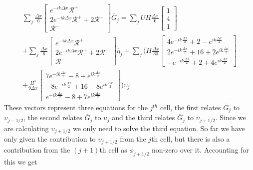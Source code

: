 \begin{multline*}
\sum_j \frac{\Delta x}{6}\begin{bmatrix} e^{-ik\Delta x} \mathcal{R}^+ \\2 e^{-ik\Delta x} \mathcal{R}^+ +2 \mathcal{R}^-\\ \mathcal{R}^- \end{bmatrix} \overline{G}_{j} = \sum_jUH \frac{\Delta x}{6}\begin{bmatrix} 1 \\4 \\ 1 \end{bmatrix}  \\+  \sum_j \frac{\Delta x}{6}\begin{bmatrix} e^{-ik\Delta x} \mathcal{R}^+ \\2 e^{-ik\Delta x} \mathcal{R}^+ +2 \mathcal{R}^-\\ \mathcal{R}^- \end{bmatrix} \overline{\eta}_{j}  + \sum_j \Bigg(H\frac{\Delta x}{30}\begin{bmatrix} 4e^{-ik\frac{\Delta x}{2}} +  2 - e^{ik\frac{\Delta x}{2}}\\2e^{-ik\frac{\Delta x}{2}}  + 16  +2 e^{ik\frac{\Delta x}{2}}  \\ -e^{-ik\frac{\Delta x}{2}} +  2 + 4e^{ik\frac{\Delta x}{2}} \end{bmatrix} \\+ \frac{H^3 }{9\Delta x}\begin{bmatrix} 7e^{-ik\frac{\Delta x}{2}} -8 + e^{ik\frac{\Delta x}{2}} \\ -8e^{-ik\frac{\Delta x}{2}} +  16  -8e^{ik\frac{\Delta x}{2}} \\ e^{-ik\frac{\Delta x}{2}} -8 + 7e^{ik\frac{\Delta x}{2}} \end{bmatrix}  \Bigg) \upsilon_j.
\end{multline*}
These vectors represent three equations for the $j^{th}$ cell, the first relates $\overline{G}_j$ to $\upsilon_{j-1/2}$, the second relates $\overline{G}_j$ to $\upsilon_{j}$ and the third relates $\overline{G}_j$ to $\upsilon_{j+1/2}$. Since we are calculating $\upsilon_{j+1/2}$ we only need to solve  the third equation. So far we have only given the contribution to $\upsilon_{j+1/2}$ from the $j$th cell, but there is also a contribution from the $(j+1)$th cell as $\phi_{j+1/2}$ non-zero over it. Accounting for this we get
